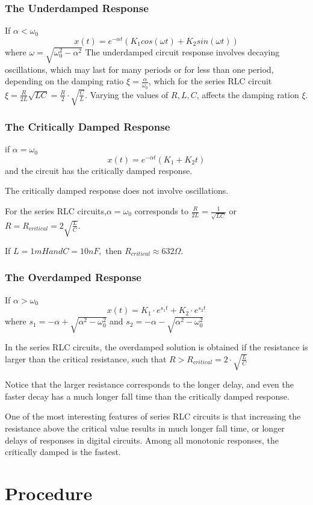 \documentclass[12pt]{article}
\begin{document}
\subsubsection{The Underdamped Response}
If $\alpha<\omega_0$
$$x(t)=e^{-\alpha t}(K_1cos(\omega t)+K_2sin(\omega t))$$
where $\omega=\sqrt{\omega_0^2-\alpha^2}$
The underdamped circuit response involves decaying oscillations, which may
last for many periods or for less than one period, depending on the damping
ratio $\xi=\frac{\alpha}{\omega_0}$, which for the series RLC circuit $\xi=\frac{R}{2L}\sqrt{LC}=\frac{R}{2}\cdot\sqrt{\frac{C}{L}}$. Varying the values of $R,L,C$, affects the damping ration $\xi$.
\subsubsection{The Critically Damped Response}
if $\alpha=\omega_0$
$$x(t)=e^{-\alpha t}(K_1+K_2t)$$
and the circuit has the critically damped response.
\par The critically damped response does not involve oscillations.
\par For the series RLC circuits,$\alpha=\omega_0$ corresponds to $\frac{R}{2L}=\frac{1}{\sqrt{LC}}$ or $R=R_{critical}=2\sqrt{\frac{L}{C}}$.
\par If $L=1mH and C=10nF,$ then $R_{critical}\approx 632\Omega.$
\subsubsection{The Overdamped Response}
If $\alpha>\omega_0$
$$x(t)=K_1\cdot e^{s_1t}+K_2\cdot e^{s_2t}$$
where $s_1=-\alpha+\sqrt{\alpha^2-\omega_0^2}$ and $s_2=-\alpha-\sqrt{\alpha^2-\omega_0^2}$
\par In the series RLC circuits, the overdamped solution is obtained if the resistance is larger than the critical resistance, such that $R>R_{critical}=2\cdot\sqrt{\frac{L}{C}}$
\par Notice that the larger resistance corresponds to the longer delay, and even
the faster decay has a much longer fall time than the critically damped response.
\par One of the most interesting features of series RLC circuits is that increasing
the resistance above the critical value results in much longer fall time, or longer
delays of responses in digital circuits. Among all monotonic responses, the
critically damped is the fastest.
\section{Procedure}
\end{document}
